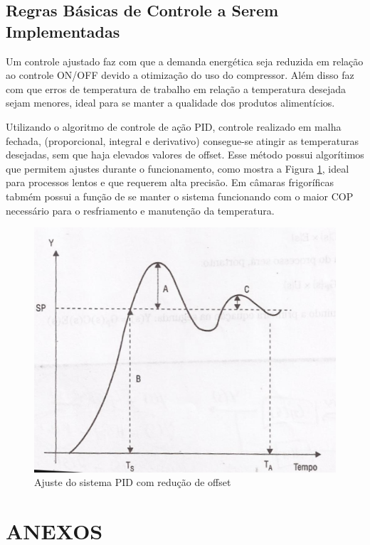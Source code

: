 \documentclass[10pt,a4paper]{article}
\begin{document}
\subsection{{Regras Básicas de Controle a Serem Implementadas}}
Um controle ajustado faz com que a demanda energética seja reduzida em relação ao controle ON/OFF devido a otimização do uso do compressor. Além disso faz com que erros de temperatura de trabalho em relação a temperatura desejada sejam menores, ideal para se manter a qualidade dos produtos alimentícios.

Utilizando o algoritmo de controle de ação PID, controle realizado em malha fechada, (proporcional, integral e derivativo) consegue-se atingir as temperaturas desejadas, sem que haja elevados valores de offset. Esse método possui algorítimos que permitem ajustes durante o funcionamento, como mostra a Figura \ref{fig_pid}, ideal para processos lentos e que requerem alta precisão. Em câmaras frigoríficas tabmém possui a função de se manter o sistema funcionando com o maior COP necessário para o resfriamento e manutenção da temperatura.

\begin{figure}[H]
    \centering
    \includegraphics[scale = 1]{Figuras/insta.png}
    \caption{Ajuste do sistema PID com redução de offset}
    \label{fig_pid}
\end{figure}


\newpage
\section{ANEXOS}
\end{document}
